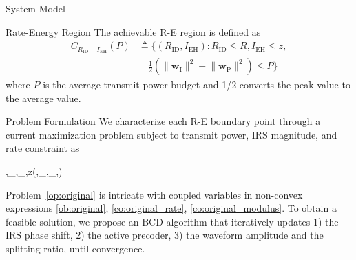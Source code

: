 \documentclass[journal]{IEEEtran}
\begin{document}
\begin{section}{System Model}
		\begin{subsection}{Rate-Energy Region}
			The achievable R-E region is defined as
			\begin{align}
				C_{R_{\mathrm{ID}}-I_{\mathrm{EH}}}(P)
				&\triangleq \biggl\{(R_{\mathrm{ID}}, I_{\mathrm{EH}}): R_{\mathrm{ID}} \le R, I_{\mathrm{EH}} \le z,\nonumber\\
				&\quad \frac{1}{2}\left(\lVert{\boldsymbol{w}_{\mathrm{I}}}\rVert^2+\lVert{\boldsymbol{w}_{\mathrm{P}}}\rVert^2\right) \le P\biggr\}
			\end{align}
			where $P$ is the average transmit power budget and \num{1/2} converts the peak value to the average value.
		\end{subsection}
	\end{section}


	\begin{section}{Problem Formulation}\label{se:problem_formulation}
		We characterize each R-E boundary point through a current maximization problem subject to transmit power, IRS magnitude, and rate constraint as
		\begin{maxi!}
			{\boldsymbol{\phi},_{},_{},\rho}{z(\boldsymbol{\phi},_{},_{},\rho)}{\label{op:original}}{\label{ob:original}}
			\label{co:original_power}
			\label{co:original_rate}
			\label{co:original_modulus}
		\end{maxi!}

		Problem~\eqref{op:original} is intricate with coupled variables in non-convex expressions \eqref{ob:original}, \eqref{co:original_rate}, \eqref{co:original_modulus}. To obtain a feasible solution, we propose an BCD algorithm that iteratively updates 1) the IRS phase shift, 2) the active precoder, 3) the waveform amplitude and the splitting ratio, until convergence.



\end{section}
\end{document}
